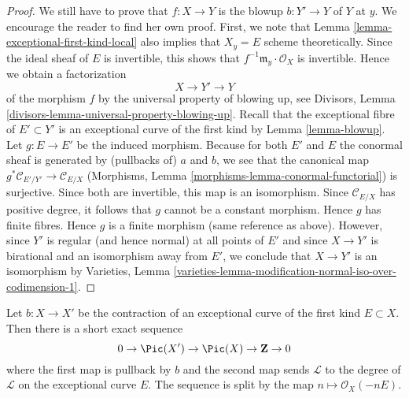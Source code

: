 \begin{proof}
\medskip\noindent
We still have to prove that $f : X \to Y$ is the blowup $b : Y' \to Y$
of $Y$ at $y$. We encourage the reader to find her own proof.
First, we note that Lemma \ref{lemma-exceptional-first-kind-local}
also implies that $X_y = E$ scheme theoretically.
Since the ideal sheaf of $E$ is invertible, this shows
that $f^{-1}\mathfrak m_y \cdot \mathcal{O}_X$ is invertible.
Hence we obtain a factorization
$$
X \to Y' \to Y
$$
of the morphism $f$ by the universal property of blowing up, see
Divisors, Lemma \ref{divisors-lemma-universal-property-blowing-up}.
Recall that the exceptional fibre of $E' \subset Y'$ is an exceptional
curve of the first kind by Lemma \ref{lemma-blowup}.
Let $g : E \to E'$ be the induced morphism.
Because for both $E'$ and $E$ the conormal sheaf is generated
by (pullbacks of) $a$ and $b$, we see that the canonical map
$g^*\mathcal{C}_{E'/Y'} \to \mathcal{C}_{E/X}$
(Morphisms, Lemma \ref{morphisms-lemma-conormal-functorial})
is surjective. Since both are invertible, this map is an isomorphism.
Since $\mathcal{C}_{E/X}$ has positive degree, it follows that $g$
cannot be a constant morphism.
Hence $g$ has finite fibres. Hence $g$ is a finite morphism
(same reference as above). However, since $Y'$ is regular
(and hence normal) at all points of $E'$ and since $X \to Y'$
is birational and an isomorphism away from $E'$, we conclude
that $X \to Y'$ is an isomorphism by
Varieties, Lemma
\ref{varieties-lemma-modification-normal-iso-over-codimension-1}.
\end{proof}

\begin{lemma}
\label{lemma-pic-blowup}
Let $b : X \to X'$ be the contraction of an
exceptional curve of the first kind $E \subset X$.
Then there is a short exact sequence
$$
0 \to \Pic(X') \to \Pic(X) \to \mathbf{Z} \to 0
$$
where the first map is pullback by $b$ and the second map sends
$\mathcal{L}$ to the degree of $\mathcal{L}$ on the exceptional
curve $E$. The sequence is split by the map
$n \mapsto \mathcal{O}_X(-nE)$.
\end{lemma}

